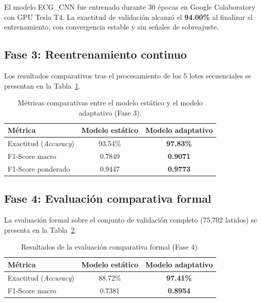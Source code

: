\documentclass[11pt,spanish]{citedi}
\begin{document}
El modelo ECG\_CNN fue entrenado durante 30 épocas en Google Colaboratory con GPU Tesla T4. La exactitud de validación alcanzó el \textbf{94.00\%} al finalizar el entrenamiento, con convergencia estable y sin señales de sobreajuste.

\subsection{Fase 3: Reentrenamiento continuo}

Los resultados comparativos tras el procesamiento de los 5 lotes secuenciales se presentan en la Tabla~\ref{T_fase3}.

\begin{table}[h]
\caption{Métricas comparativas entre el modelo estático y el modelo adaptativo (Fase 3).}
\label{T_fase3}
\begin{center}
\begin{tabular}{lcc}
\toprule
\textbf{Métrica} & \textbf{Modelo estático} & \textbf{Modelo adaptativo} \\
\midrule
Exactitud (\textit{Accuracy}) & 93.54\% & \textbf{97.83\%} \\
F1-Score macro                & 0.7849  & \textbf{0.9071}  \\
F1-Score ponderado            & 0.9447  & \textbf{0.9773}  \\
\bottomrule
\end{tabular}
\end{center}
\end{table}

\subsection{Fase 4: Evaluación comparativa formal}

La evaluación formal sobre el conjunto de validación completo (75,702 latidos) se presenta en la Tabla~\ref{T_fase4}.

\begin{table}[h]
\caption{Resultados de la evaluación comparativa formal (Fase 4).}
\label{T_fase4}
\begin{center}
\begin{tabular}{lcc}
\toprule
\textbf{Métrica} & \textbf{Modelo estático} & \textbf{Modelo adaptativo} \\
\midrule
Exactitud (\textit{Accuracy}) & 88.72\% & \textbf{97.41\%} \\
F1-Score macro                & 0.7381  & \textbf{0.8954}  \\
\bottomrule
\end{tabular}
\end{center}
\end{table}
\end{document}

